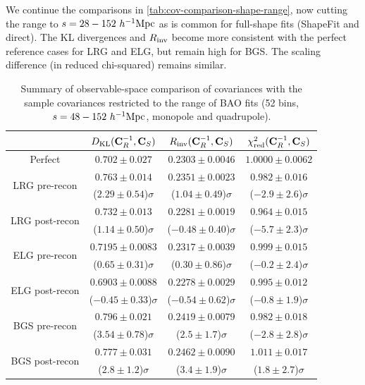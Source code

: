 We continue the comparisons in \cref{tab:cov-comparison-shape-range}, now cutting the range to $s=28-152~h^{-1}{\rm Mpc}$ as is common for full-shape fits (ShapeFit and direct).
The KL divergences and $R_{\rm inv}$ become more consistent with the perfect reference cases for LRG and ELG, but remain high for BGS.
The scaling difference (in reduced chi-squared) remains similar.

\begin{table}[tb]
\centering
\begin{tabular}{|c|c|c|c|}
\hline
 & $D_{\rm KL} ({\bf C}_R^{-1}, {\bf C}_S)$ & $R_{\rm inv} ({\bf C}_R^{-1}, {\bf C}_S)$ & $\chi^2_{\rm red} ({\bf C}_R^{-1}, {\bf C}_S)$ \\
\hline
Perfect & $0.702 \pm 0.027$ & $0.2303 \pm 0.0046$ & $1.0000 \pm 0.0062$ \\
\hline
\multirow{2}{*}{LRG pre-recon} & $0.763 \pm 0.014$ & $0.2351 \pm 0.0023$ & $0.982 \pm 0.016$ \\
 & ($2.29 \pm 0.54$)$\sigma$ & ($1.04 \pm 0.49$)$\sigma$ & ($-2.9 \pm 2.6$)$\sigma$ \\
\hline
\multirow{2}{*}{LRG post-recon} & $0.732 \pm 0.013$ & $0.2281 \pm 0.0019$ & $0.964 \pm 0.015$ \\
 & ($1.14 \pm 0.50$)$\sigma$ & ($-0.48 \pm 0.40$)$\sigma$ & ($-5.7 \pm 2.3$)$\sigma$ \\
\hline
\multirow{2}{*}{ELG pre-recon} & $0.7195 \pm 0.0083$ & $0.2317 \pm 0.0039$ & $0.999 \pm 0.015$ \\
 & ($0.65 \pm 0.31$)$\sigma$ & ($0.30 \pm 0.86$)$\sigma$ & ($-0.2 \pm 2.4$)$\sigma$ \\
\hline
\multirow{2}{*}{ELG post-recon} & $0.6903 \pm 0.0088$ & $0.2278 \pm 0.0029$ & $0.995 \pm 0.012$ \\
 & ($-0.45 \pm 0.33$)$\sigma$ & ($-0.54 \pm 0.62$)$\sigma$ & ($-0.8 \pm 1.9$)$\sigma$ \\
\hline
\multirow{2}{*}{BGS pre-recon} & $0.796 \pm 0.021$ & $0.2419 \pm 0.0079$ & $0.982 \pm 0.018$ \\
 & ($3.54 \pm 0.78$)$\sigma$ & ($2.5 \pm 1.7$)$\sigma$ & ($-2.8 \pm 2.8$)$\sigma$ \\
\hline
\multirow{2}{*}{BGS post-recon} & $0.777 \pm 0.031$ & $0.2462 \pm 0.0090$ & $1.011 \pm 0.017$ \\
 & ($2.8 \pm 1.2$)$\sigma$ & ($3.4 \pm 1.9$)$\sigma$ & ($1.8 \pm 2.7$)$\sigma$ \\
\hline
\end{tabular}
\caption[Observable-space comparison of \rascalc{} covariances with the \desimock{} sample covariances restricted to the range of BAO fits]{Summary of observable-space comparison of \rascalc{} covariances with the sample covariances restricted to the range of BAO fits (52 bins, $s=48-152~h^{-1}{\rm Mpc}$, monopole and quadrupole).}
\label{tab:cov-comparison-BAO-range}
\end{table}


